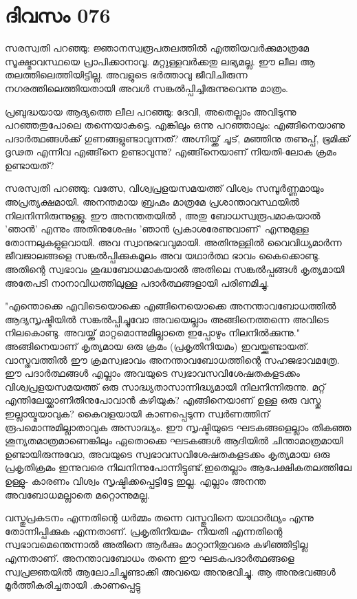  
\section{ദിവസം 076}


സരസ്വതി പറഞ്ഞു: ജ്ഞാനസ്വരൂപതലത്തില്‍ എത്തിയവര്‍ക്കുമാത്രമേ സൂക്ഷ്മാവസ്ഥയെ
 പ്രാപിക്കാനാവൂ. മറ്റുള്ളവര്‍ക്കതു ലഭ്യമല്ല. ഈ ലീല ആ തലത്തിലെത്തിയിട്ടില്ല. അവളുടെ ഭര്‍ത്താവു ജീവിചിരുന്ന നഗരത്തിലെത്തിയതായി അവള്‍ സങ്കല്‍പ്പിച്ചിരുന്നുവെന്നു മാത്രം.

പ്രബുദ്ധയായ ആദ്യത്തെ ലീല പറഞ്ഞു: ദേവി, അതെല്ലാം അവിടുന്നു പറഞ്ഞതുപോലെ തന്നെയാകട്ടെ. എങ്കിലും ഒന്നു പറഞ്ഞാലും: എങ്ങിനെയാണു പദാര്‍ത്ഥങ്ങള്‍ക്ക്‌ ഗുണങ്ങളുണ്ടാവുന്നത്‌? അഗ്നിയ്ക്ക്‌ ചൂട്‌, മഞ്ഞിനു തണുപ്പ്‌, ഭൂമിക്ക്‌ ദൃഢത എന്നിവ എങ്ങി്‌നെ ഉണ്ടാവുന്നു? എങ്ങി്‌നെയാണ്‌ നിയതി-ലോക ക്രമം ഉണ്ടായത്‌?

സരസ്വതി പറഞ്ഞു: വത്സേ, വിശ്വപ്രളയസമയത്ത്‌ വിശ്വം സമ്പൂര്‍ണ്ണമായും അപ്രത്യക്ഷമായി. അനന്തമായ ബ്രഹ്മം മാത്രമേ പ്രശാന്താവസ്ഥയില്‍ നിലനിന്നിരുന്നുള്ളു. ഈ അനന്തതയില്‍ , അതു ബോധസ്വരൂപമാകയാല്‍ 'ഞാന്‍' എന്നും അതിനുശേഷം 'ഞാന്‍ പ്രകാശരേണുവാണ്‌' എന്നുമുള്ള തോന്നലുകളുളവായി. അവ സ്വാനുഭവവുമായി. അതിനുള്ളില്‍ വൈവിധ്യമാര്‍ന്ന ജീവജാലങ്ങളെ സങ്കല്‍പ്പിക്കുകമൂലം അവ യഥാര്‍ത്ഥ ഭാവം കൈക്കൊണ്ടു. അതിന്റെ സ്വഭാവം ശുദ്ധബോധമാകയാല്‍ അതിലെ സങ്കല്‍പ്പങ്ങള്‍ കൃത്യമായി അതേപടി നാനാവിധത്തിലുള്ള പദാര്‍ത്ഥങ്ങളായി പരിണമിച്ചു.

"എന്തൊക്കെ എവിടെയൊക്കെ എങ്ങിനെയൊക്കെ അനന്താവബോധത്തില്‍ ആദ്യസൃഷ്ടിയില്‍ സങ്കല്‍പ്പിച്ചുവോ അവയെല്ലാം അങ്ങിനെത്തന്നെ അവിടെ നിലകൊണ്ടു. അവയ്ക്ക്‌ മാറ്റമൊന്നുമില്ലാതെ ഇപ്പോഴും നിലനില്‍ക്കുന്നു." അങ്ങിനെയാണ്‌ കൃത്യമായ ഒരു ക്രമം (പ്രകൃതിനിയമം) ഇവയ്ക്കുണ്ടായത്‌. വാസ്തവത്തില്‍ ഈ ക്രമസ്വഭാവം അനന്താവബോധത്തിന്റെ സഹജഭാവമത്രേ. ഈ പദാര്‍ത്ഥങ്ങള്‍ എല്ലാം അവയുടെ സ്വഭാവസവിശേഷതകളടക്കം വിശ്വപ്രളയസമയത്ത്‌ ഒരു സാദ്ധ്യതാസാന്നിദ്ധ്യമായി നിലനിന്നിരുന്നു. മറ്റ്‌ എന്തിലേയ്ക്കാണിതിനുപോവാന്‍ കഴിയുക? എങ്ങിനെയാണ്‌ ഉള്ള ഒരു വസ്തു ഇല്ലായ്മയാവുക? കൈവളയായി കാണപ്പെടുന്ന സ്വര്‍ണത്തിന്‌ രൂപമൊന്നുമില്ലാതാവുക അസാദ്ധ്യം. ഈ സൃഷ്ടിയുടെ ഘടകങ്ങളെല്ലാം തികഞ്ഞ ശൂന്യതമാത്രമാണെങ്കിലും ഏതൊക്കെ ഘടകങ്ങള്‍ ആദിയില്‍ ചിന്താമാത്രമായി ഉണ്ടായിരുന്നുവോ, അവയുടെ സ്വഭാവസവിശേഷതകളടക്കം കൃത്യമായ ഒരു പ്രകൃതിക്രമം ഇന്നുവരെ നിലനിന്നുപോന്നിട്ടുണ്ട്‌.ഇതെല്ലാം ആപേക്ഷികതലത്തിലേ ഉള്ളു- കാരണം വിശ്വം സൃഷ്ടിക്കപ്പെട്ടിട്ടേ ഇല്ല. എല്ലാം അനന്ത അവബോധമല്ലാതെ മറ്റൊന്നുമല്ല.

വസ്തുപ്രകടനം എന്നതിന്റെ ധര്‍മ്മം തന്നെ വസ്തുവിനെ യാഥാര്‍ഥ്യം എന്നു തോന്നിപ്പിക്കുക എന്നതാണ്‌. പ്രകൃതിനിയമം- നിയതി എന്നതിന്റെ സ്വഭാവമെന്തെന്നാല്‍ അതിനെ ആര്‍ക്കും മാറ്റാനിതുവരെ കഴിഞ്ഞിട്ടില്ല എന്നതാണ്‌. അനന്താവബോധം തന്നെ ഈ ഘടകപദാര്‍ത്ഥങ്ങളെ സ്വപ്രജ്ഞയില്‍ ആലോചിച്ചുണ്ടാക്കി അവയെ അനുഭവിച്ചു. ആ അനുഭവങ്ങള്‍ മൂര്‍ത്തീകരിച്ചതായി .കാണപ്പെട്ടു

